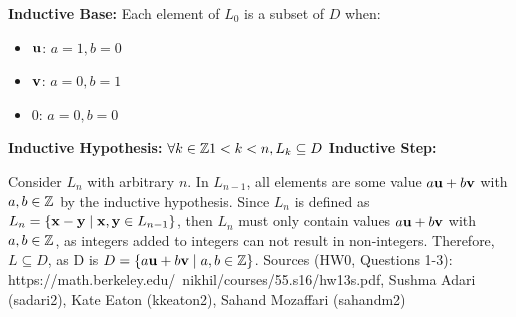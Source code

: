 \documentclass[11pt]{article}
\begin{document}
\begin{solution}[2]
\item 
\textbf{Inductive Base:} Each element of $L_0$ is a subset of $D$ when:
\begin{itemize}
\item ${\bf u}$: $a = 1, b = 0$
\item ${\bf v}$: $a = 0, b = 1$
\item ${0}$: $a = 0, b = 0$
\end{itemize} 
\textbf{Inductive Hypothesis:} $\forall k \in \Z 1 < k < n, L_k \subseteq D$
\textbf{Inductive Step:} 
\item Consider $L_n$ with arbitrary $n$. In $L_{n-1}$, all elements are some value $a{\bf u} + b{\bf v}$ with $a, b \in \Z$ by the inductive hypothesis. Since $L_n$ is defined as $L_n = \{ {\bf x}- {\bf y} \mid {\bf x}, {\bf y}  \in L_{n-1} \}$, then $L_n$ must only contain values $a{\bf u} + b{\bf v}$ with $a, b \in \Z$, as integers added to integers can not result in non-integers. Therefore, $L \subseteq D$, as D is $D = \{ a{\bf u}+b{\bf v} \mid a,b \in \Z \}$.
\vspace*{\fill} 
Sources (HW0, Questions 1-3): https://math.berkeley.edu/~nikhil/courses/55.s16/hw13s.pdf, Sushma Adari (sadari2), Kate Eaton (kkeaton2), Sahand Mozaffari (sahandm2)
\end{solution}
\end{document}
